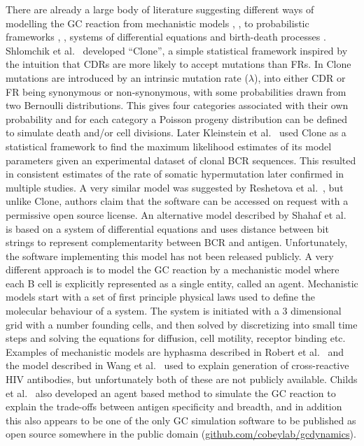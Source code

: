 There are already a large body of literature suggesting different ways of modelling the GC reaction from mechanistic models \cite{Childs_Baskerville_Cobey_2015}, \cite{robert2017simulate}, to probabilistic frameworks \cite{shlomchik1998clone}, \cite{Reshetova_2017}, systems of differential equations \cite{shahaf2008antigen} and birth-death processes \cite{Balelli_2016}.
Shlomchik et al.\ \cite{shlomchik1998clone} developed ``Clone'', a simple statistical framework inspired by the intuition that CDRs are more likely to accept mutations than FRs.
In Clone mutations are introduced by an intrinsic mutation rate ($\lambda$), into either CDR or FR being synonymous or non-synonymous, with some probabilities drawn from two Bernoulli distributions.
This gives four categories associated with their own probability and for each category a Poisson progeny distribution can be defined to simulate death and/or cell divisions.
Later Kleinstein et al.\ \cite{kleinstein2003estimating} used Clone as a statistical framework to find the maximum likelihood estimates of its model parameters given an experimental dataset of clonal BCR sequences.
This resulted in consistent estimates of the rate of somatic hypermutation later confirmed in multiple studies.
A very similar model was suggested by Reshetova et al.\ \cite{Reshetova_2017}, but unlike Clone, authors claim that the software can be accessed on request with a permissive open source license.
An alternative model described by Shahaf et al.\ \cite{shahaf2008antigen} is based on a system of differential equations and uses distance between bit strings to represent complementarity between BCR and antigen.
Unfortunately, the software implementing this model has not been released publicly.
A very different approach is to model the GC reaction by a mechanistic model where each B cell is explicitly represented as a single entity, called an agent.
Mechanistic models start with a set of first principle physical laws used to define the molecular behaviour of a system.
The system is initiated with a 3 dimensional grid with a number founding cells, and then solved by discretizing into small time steps and solving the equations for diffusion, cell motility, receptor binding etc.
Examples of mechanistic models are hyphasma described in Robert et al.\ \cite{robert2017simulate} and the model described in Wang et al.\ \cite{wang2015manipulating} used to explain generation of cross-reactive HIV antibodies, but unfortunately both of these are not publicly available.
Childs et al.\ \cite{Childs_Baskerville_Cobey_2015} also developed an agent based method to simulate the GC reaction to explain the trade-offs between antigen specificity and breadth, and in addition this also appears to be one of the only GC simulation software to be published as open source somewhere in the public domain (\url{github.com/cobeylab/gcdynamics}).

